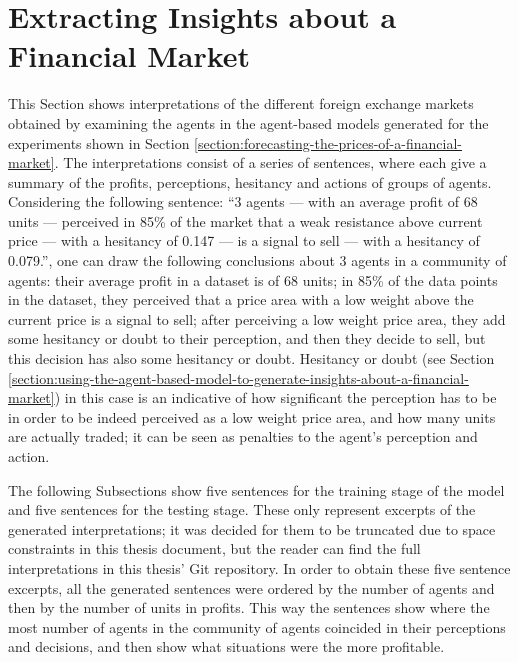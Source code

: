 \newpage

\section{Extracting Insights about a Financial Market}
\label{section:extracting-insights-about-a-financial-market}

This Section shows interpretations of the different foreign exchange markets
obtained by examining the agents in the agent-based models generated for the experiments shown in Section \ref{section:forecasting-the-prices-of-a-financial-market}. The interpretations
consist of a series of sentences, where each give a summary of the profits,
perceptions, hesitancy and actions of groups of agents. Considering the
following sentence: ``3 agents — with an average profit of 68 units — perceived
in 85\% of the market that a weak resistance above current price — with a
hesitancy of 0.147 — is a signal to sell — with a hesitancy of 0.079.'', one can
draw the following conclusions about 3 agents in a community of agents: their
average profit in a dataset is of 68 units; in 85\% of the data points in the
dataset, they perceived that a price area with a low weight above the current
price is a signal to sell; after perceiving a low weight price area, they add
some hesitancy or doubt to their perception, and then they decide to sell, but
this decision has also some hesitancy or doubt. Hesitancy or doubt (see Section
\ref{section:using-the-agent-based-model-to-generate-insights-about-a-financial-market})
in this case is an indicative of how significant the perception has to be in
order to be indeed perceived as a low weight price area, and how many units are
actually traded; it can be seen as penalties to the agent's perception and
action.

The following Subsections show five sentences for the training stage of the
model and five sentences for the testing stage. These only represent excerpts of
the generated interpretations; it was decided for them to be truncated due to
space constraints in this thesis document, but the reader can find the full
interpretations in this thesis' Git repository. In order to obtain these five
sentence excerpts, all the generated sentences were ordered by the number of
agents and then by the number of units in profits. This way the sentences show
where the most number of agents in the community of agents coincided in their
perceptions and decisions, and then show what situations were the more
profitable.

